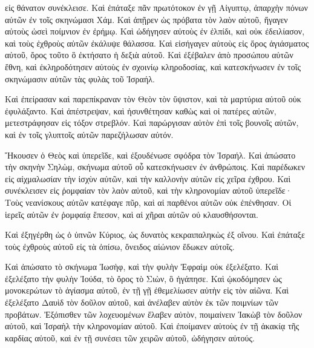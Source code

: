{εἰς θάνατον συνέκλεισε. Καὶ ἐπάταξε πᾶν πρωτότοκον ἐν γῇ Αἰγυπτῳ, ἀπαρχὴν πόνων αὐτῶν ἐν τοῖς σκηνώμασι Χάμ.
Καὶ ἀπῇρεν ὡς πρόβατα τὸν λαὸν αὐτοῦ, ἤγαγεν αὐτοὺς ὡσεὶ
ποίμνιον ἐν ἐρήμῳ. Καὶ ὡδήγησεν αὐτοὺς ἐν ἐλπίδι, καὶ οὐκ ἐδειλίασον, καὶ τοὺς ἐχθροὺς αὐτῶν ἐκάλυψε θάλασσα.
Καὶ εἰσήγαγεν αὐτοὺς εἰς ὄρος ἁγιάσματος αὐτοῦ, ὄρος τοῦτο ὃ
ἐκτήσατο ἡ δεξιὰ αὐτοῦ. Καὶ ἐξέβαλεν ἀπὸ προσώπου αὐτῶν ἔθνη, καὶ ἐκληροδότησεν αὐτοὺς ἐν σχοινίῳ κληροδοσίας, καὶ κατεσκήνωσεν ἐν τοῖς σκηνώμασιν αὐτῶν τὰς φυλὰς τοῦ Ἰσραήλ.
\par }{\PP {}Καὶ ἐπείρασαν καὶ παρεπίκραναν τὸν Θεὸν τὸν ὕψιστον, καὶ τὰ μαρτύρια αὐτοῦ οὐκ ἐφυλάξαντο.
Καὶ ἀπέστρεψαν, καὶ ἠσυνθέτησαν καθὼς καὶ οἱ πατέρες αὐτῶν, μετεστράφησαν εἰς τόξον στρεβλόν.
Καὶ παρώργισαν αὐτὸν ἐπὶ τοῖς βουνοῖς αὐτῶν, καὶ ἐν τοῖς γλυπτοῖς αὐτῶν παρεζήλωσαν αὐτόν.
\par }{\PP {}Ἤκουσεν ὁ Θεὸς καὶ ὑπερεῖδε, καὶ ἐξουδένωσε σφόδρα τὸν
Ἰσραήλ. Καὶ ἀπώσατο τὴν σκηνὴν Σηλὼμ, σκήνωμα αὐτοῦ
οὗ κατεσκήνωσεν ἐν ἀνθρώποις. Καὶ παρέδωκεν εἰς αἰχμαλωσίαν τὴν ἰσχὺν αὐτῶν, καὶ τὴν καλλονὴν αὐτῶν εἰς χεῖρα
ἐχθρου. Καὶ συνέκλεισεν εἰς ῥομφαίαν τὸν λαὸν αὐτοῦ, καὶ τὴν κληρονομίαν αὐτοῦ ὑπερεῖδε·
Τοὺς νεανίσκους αὐτῶν κατέφαγε πῦρ, καὶ αἱ παρθένοι αὐτῶν οὐκ ἐπένθησαν. Οἱ
ἱερεῖς αὐτῶν ἐν ῥομφαίᾳ ἔπεσον, καὶ αἱ χῆραι αὐτῶν οὐ κλαυσθήσονται.
\par }{\PP {}Καὶ ἐξηγέρθη ὡς ὁ ὑπνῶν Κύριος, ὡς δυνατὸς κεκραιπαληκὼς
ἐξ οἴνου. Καὶ ἐπάταξε τοὺς ἐχθροὺς αὐτοῦ εἰς τὰ ὀπίσω, ὄνειδος αἰώνιον ἔδωκεν αὐτοῖς.
\par }{\PP {}Καὶ ἀπώσατο τὸ σκήνωμα Ἰωσὴφ, καὶ τὴν φυλὴν Ἐφραὶμ
οὐκ ἐξελέξατο. Καὶ ἐξελέξατο τὴν φυλὴν Ἰούδα, τὸ ὄρος τὸ
Σιὼν, ὃ ἠγάπησε. Καὶ ᾠκοδόμησεν ὡς μονοκερώτων τὸ ἁγίασμα αὐτοῦ, ἐν τῇ γῇ ἐθεμελίωσεν αὐτὴν εἰς τὸν αἰῶνα.
Καὶ ἐξελέξατο Δαυὶδ τὸν δοῦλον αὐτοῦ, καὶ ἀνέλαβεν αὐτὸν ἐκ τῶν
ποιμνίων τῶν προβάτων. Ἐξόπισθεν τῶν λοχευομένων ἔλαβεν αὐτὸν, ποιμαίνειν Ἰακὼβ τὸν δοῦλον αὐτοῦ, καὶ Ἰσραὴλ τὴν
κληρονομίαν αὐτοῦ. Καὶ ἐποίμανεν αὐτοὺς ἐν τῇ ἀκακίᾳ τῆς καρδίας αὐτοῦ, καὶ ἐν τῇ συνέσει τῶν χειρῶν αὐτοῦ, ὡδήγησεν αὐτούς.

}
